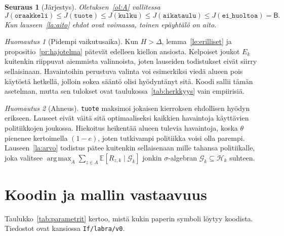 \documentclass[11pt,a4paper]{article}
\theoremstyle{plain}
\newtheorem{seuraus}{Seuraus}
\theoremstyle{definition}
\theoremstyle{remark}
\newtheorem{huomautus}{Huomautus}
\newcommand{\E}{\mathbb{E}}
\newcommand{\cG}{\mathcal{G}}
\newcommand{\cH}{\mathcal{H}}
\newcommand{\1}{\mathbf{1}}
\newcommand{\pol}[1]{\texttt{#1}}
\DeclareMathOperator*{\argmax}{arg\,max}
\begin{document}
\begin{seuraus}[Järjestys]\label{se:jarjestys}
Oletuksen~\ref{ol:A} vallitessa
\[
  J(\pol{oraakkeli}) \le J(\pol{tuote}) \le J(\pol{kulku}) \le J(\pol{aikataulu}) \le J(\pol{ei\_huoltoa}) = \mathsf{B}.
\]
Kun lauseen~\ref{la:aito} ehdot ovat voimassa, toinen epäyhtälö on aito.
\end{seuraus}

\begin{huomautus}[Pidempi vaikutusaika]\label{hu:H}
Kun $H > \Delta$, lemma~\ref{le:erilliset} ja propositio~\ref{pr:hajotelma}
pätevät edelleen kiellon ansiosta. Kelpoiset joukot $E_k$ kuitenkin riippuvat
aiemmista valinnoista, joten lauseiden todistukset eivät siirry sellaisinaan.
Havaintoihin perustuva valinta voi esimerkiksi viedä alueen pois käytöstä
hetkellä, jolloin sokea sääntö olisi hyödyntänyt sitä. Koodi sallii tämän
asetelman, mutta sen tulokset ovat taulukossa~\ref{tab:herkkyys} vain empiirisiä.
\end{huomautus}

\begin{huomautus}[Ahneus]
\pol{tuote} maksimoi jokaisen kierroksen ehdollisen hyödyn erikseen. Lauseet
eivät väitä sitä optimaaliseksi kaikkien havaintoja käyttävien politiikkojen
joukossa. Hiekoitus heikentää alueen tulevia havaintoja, koska $\theta$
pienenee kertoimella $(1-e)$, joten tutkivampi politiikka voisi olla parempi.
Lauseen~\ref{la:arvo} todistus pätee kuitenkin sellaisenaan mille tahansa
politiikalle, joka valitsee $\argmax_A \sum_{z\in A}\E[R_{z,k} \mid \cG_k]$
jonkin $\sigma$-algebran $\cG_k \subseteq \cH_k$ suhteen.
\end{huomautus}

\section{Koodin ja mallin vastaavuus}\label{sec:koodi}

Taulukko~\ref{tab:parametrit} kertoo, mistä kukin paperin symboli löytyy
koodista. Tiedostot ovat kansiossa \texttt{If/labra/v0}.
\end{document}
